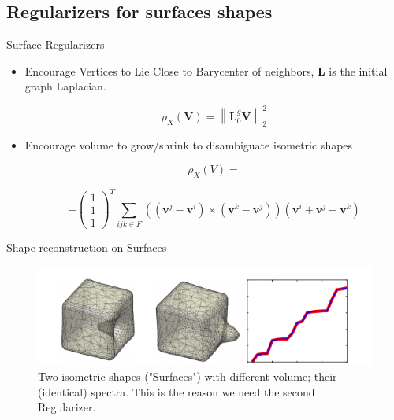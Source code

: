 \documentclass{beamer}
\begin{document}
\subsection{Regularizers for surfaces shapes}

\begin{frame}{Surface Regularizers}

\begin{itemize}
    \item Encourage Vertices to Lie Close to Barycenter of neighbors, $ \mathbf{L} $ is the initial graph Laplacian.
    
    $$ \rho_{X}(\mathbf{V}) = \left\| \mathbf{L}_0^g \mathbf{V}  \right\|_{2}^{2} $$
    
    \item Encourage volume to grow/shrink to disambiguate isometric shapes
    
    $$\rho_{X}(V) = $$
    
    $$ -\left(\begin{array}{l}1 \\ 1 \\ 1\end{array}\right)^{T} \sum_{i j k \in F}\left(\left(\mathbf{v}^{j}-\mathbf{v}^{i}\right) \times\left(\mathbf{v}^{k}-\mathbf{v}^{j}\right)\right)\left(\mathbf{v}^{i}+\mathbf{v}^{j}+\mathbf{v}^{k}\right)$$

    
\end{itemize}
    
\end{frame}

\begin{frame}{Shape reconstruction on Surfaces}
\begin{figure}
 \includegraphics[width=\textwidth]{Surfaces}
 \caption{\label{fig:Surfaces} Two isometric shapes ("Surfaces") with different volume; their (identical) spectra. This is the reason we need the second Regularizer.}
\end{figure}
    
\end{frame}
\end{document}
